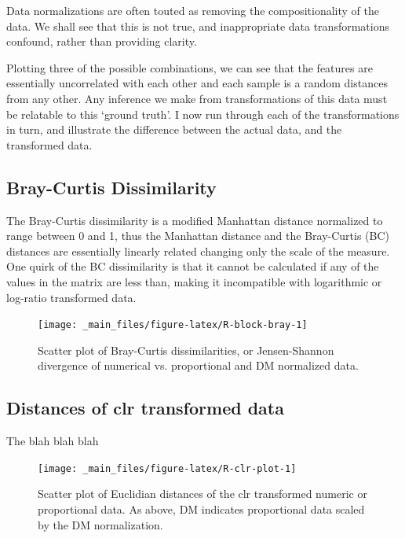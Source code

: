 \documentclass[onecolumn]{book}
\theoremstyle{definition}
\theoremstyle{definition}
\theoremstyle{definition}
\theoremstyle{remark}
\begin{document}
Data normalizations are often touted as removing the compositionality of
the data. We shall see that this is not true, and inappropriate data
transformations confound, rather than providing clarity.

Plotting three of the possible combinations, we can see that the
features are essentially uncorrelated with each other and each sample is
a random distances from any other. Any inference we make from
transformations of this data must be relatable to this `ground truth'. I
now run through each of the transformations in turn, and illustrate the
difference between the actual data, and the transformed data.

\hypertarget{bray-curtis-dissimilarity}{%
\subsection{Bray-Curtis Dissimilarity}\label{bray-curtis-dissimilarity}}

The Bray-Curtis dissimilarity is a modified Manhattan distance
normalized to range between 0 and 1, thus the Manhattan distance and the
Bray-Curtis (BC) distances are essentially linearly related changing
only the scale of the measure. One quirk of the BC dissimilarity is that
it cannot be calculated if any of the values in the matrix are less
than, making it incompatible with logarithmic or log-ratio transformed
data.

\begin{figure}

{\centering \texttt{[image: \_main\_files/figure-latex/R-block-bray-1]} 

}

\caption{Scatter plot of Bray-Curtis dissimilarities, or Jensen-Shannon divergence  of numerical vs. proportional and DM normalized data.}\label{fig:R-block-bray}
\end{figure}

\hypertarget{distances-of-clr-transformed-data}{%
\subsection{Distances of clr transformed
data}\label{distances-of-clr-transformed-data}}

The blah blah blah

\begin{figure}

{\centering \texttt{[image: \_main\_files/figure-latex/R-clr-plot-1]} 

}

\caption{Scatter plot of Euclidian distances of the clr transformed numeric or proportional data. As above, DM indicates proportional data scaled by the DM normalization.}\label{fig:R-clr-plot}
\end{figure}
\end{document}
